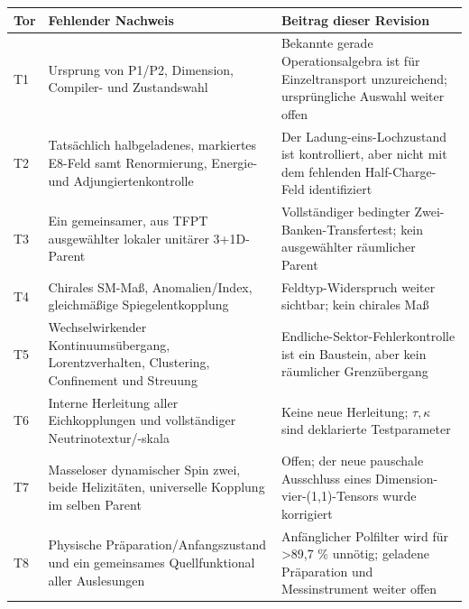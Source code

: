 {\def\LTcaptype{none} %
\begin{longtable}[]{@{}
  >{\raggedright\arraybackslash}p{}
  >{\raggedright\arraybackslash}p{}
  >{\raggedright\arraybackslash}p{}@{}}
\toprule\noalign{}
\begin{minipage}[b]{\linewidth}\raggedright
Tor
\end{minipage} & \begin{minipage}[b]{\linewidth}\raggedright
Fehlender Nachweis
\end{minipage} & \begin{minipage}[b]{\linewidth}\raggedright
Beitrag dieser Revision
\end{minipage} \\
\midrule\noalign{}
\endhead
\bottomrule\noalign{}
\endlastfoot
T1 & Ursprung von P1/P2, Dimension, Compiler- und Zustandswahl &
Bekannte gerade Operationsalgebra ist für Einzeltransport unzureichend;
ursprüngliche Auswahl weiter offen \\
T2 & Tatsächlich halbgeladenes, markiertes E8-Feld samt Renormierung,
Energie- und Adjungiertenkontrolle & Der Ladung-eins-Lochzustand ist
kontrolliert, aber nicht mit dem fehlenden Half-Charge-Feld
identifiziert \\
T3 & Ein gemeinsamer, aus TFPT ausgewählter lokaler unitärer 3+1D-Parent
& Vollständiger bedingter Zwei-Banken-Transfertest; kein ausgewählter
räumlicher Parent \\
T4 & Chirales SM-Maß, Anomalien/Index, gleichmäßige Spiegelentkopplung &
Feldtyp-Widerspruch weiter sichtbar; kein chirales Maß \\
T5 & Wechselwirkender Kontinuumsübergang, Lorentzverhalten, Clustering,
Confinement und Streuung & Endliche-Sektor-Fehlerkontrolle ist ein
Baustein, aber kein räumlicher Grenzübergang \\
T6 & Interne Herleitung aller Eichkopplungen und vollständiger
Neutrinotextur/-skala & Keine neue Herleitung; \(\tau,\kappa\) sind
deklarierte Testparameter \\
T7 & Masseloser dynamischer Spin zwei, beide Helizitäten, universelle
Kopplung im selben Parent & Offen; der neue pauschale Ausschluss eines
Dimension-vier-(1,1)-Tensors wurde korrigiert \\
T8 & Physische Präparation/Anfangszustand und ein gemeinsames
Quellfunktional aller Auslesungen & Anfänglicher Polfilter wird für
\textgreater89,7 \% unnötig; geladene Präparation und Messinstrument
weiter offen \\
\end{longtable}
}

